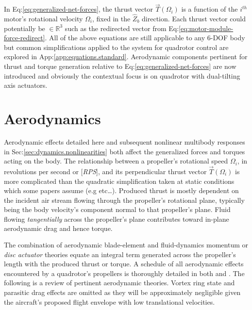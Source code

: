 In Eq:\ref{eq:generalized-net-forces}, the thrust vector $\vec{T}(\Omega_i)$ is a function of the $i^{th}$ motor's rotational velocity $\Omega_i$, fixed in the $\hat{Z}_b$ direction. Each thrust vector could potentially be $\in\mathbb{R}^3$ such as the redirected vector from Eq:\ref{eq:motor-module-force-redirect}. All of the above equations are still applicable to any 6-DOF body but common simplifications applied to the system for quadrotor control are explored in App:\ref{app:equations.standard}. Aerodynamic components pertinent for thrust and torque generation relative to Eq:\ref{eq:generalized-net-forces} are now introduced and obviously the contextual focus is on quadrotor with dual-tilting axis actuators.
\section{Aerodynamics}
\label{sec:dynamics.aero}
Aerodynamic effects detailed here and subsequent nonlinear multibody responses in Sec:\ref{sec:dynamics.nonlinearities} both affect the generalized forces and torques acting on the body. The relationship between a propeller's rotational speed $\Omega_i$, in revolutions per second or [\emph{RPS}], and its perpendicular thrust vector $\vec{T}(\Omega_i)$ is more complicated than the quadratic simplification taken at static conditions which some papers assume (e.g \cite{x4flyer} etc\ldots). Produced thrust is mostly dependent on the incident air stream flowing through the propeller's rotational plane, typically being the body velocity's component normal to that propeller's plane. Fluid flowing \emph{tangentially} across the propeller's plane contributes toward in-plane aerodynamic drag and hence torque. 
\par
The combination of aerodynamic blade-element\cite{bem,forwarddescent} and fluid-dynamics momentum or \emph{disc actuator} theories equate an integral term generated across the propeller's length with the produced thrust or torque. A schedule of all aerodynamic effects encountered by a quadrotor's propellers is thoroughly detailed in both \cite{bladesforquadrotors} and \cite{nonlineardynamics}. The following is a review of pertinent aerodynamic theories. Vortex ring state and parasitic drag effects are omitted as they will be approximately negligible given the aircraft's proposed flight envelope with low translational velocities.
